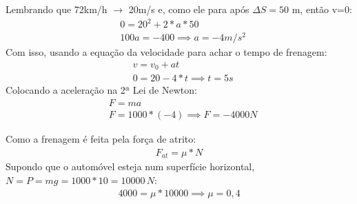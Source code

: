 \documentclass[12pt,letterpaper,fleqn]{article}
\begin{document}
\begin{itemize}
\begin{enumerate}
    Lembrando que 72km/h $\rightarrow$ 20m/s e, como ele para após $\Delta S=50$ m, então v=0:
    \begin{align*}
        &0 = 20^2 + 2*a*50 \\
        &100a = -400 \implies a =-4m/s^2
    \end{align*}
    Com isso, usando a equação da velocidade para achar o tempo de frenagem:
    \begin{align*}
        &v=v_0+at\\
        &0=20-4*t \implies \boxed{t = 5s}
    \end{align*}
    Colocando a aceleração na 2ª Lei de Newton:
    \begin{align*}
        &F=ma\\
        &F=1000*(-4) \implies \boxed{F=-4000 N}
    \end{align*}
    
    Como a frenagem é feita pela força de atrito:
    \begin{align*}
        F_{at}=\mu*N
    \end{align*}
    Supondo que o automóvel esteja num superfície horizontal, $N=P=mg=1000*10=10000\,N$:
    \begin{align*}
        4000 = \mu*10000 \implies \boxed{\mu =0,4}
    \end{align*}
\end{enumerate}
\end{itemize}
\end{document}
